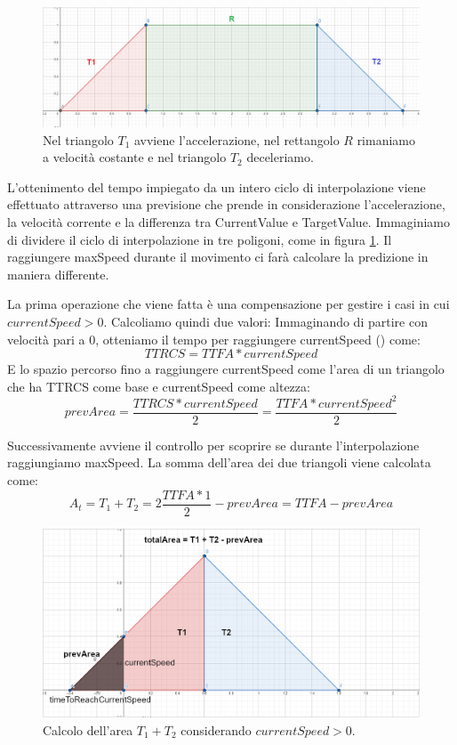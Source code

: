 \documentclass[main.tex]{subfiles}
\begin{document}
\begin{figure}
    \centering
    \captionsetup{justification=centering}
    \includegraphics[scale=0.25]{img/interpolazione/movementThreeParts.png}
    \caption{Nel triangolo $T_1$ avviene l'accelerazione, nel rettangolo $R$ rimaniamo a velocità costante e nel triangolo $T_2$ deceleriamo.}
    \label{fig:4_movementThreeParts}
\end{figure}
\noindent L'ottenimento del tempo impiegato da un intero ciclo di interpolazione viene effettuato attraverso una previsione che prende in considerazione l'accelerazione, la velocità corrente e la differenza tra CurrentValue e TargetValue. Immaginiamo di dividere il ciclo di interpolazione in tre poligoni, come in figura \ref{fig:4_movementThreeParts}. Il raggiungere maxSpeed durante il movimento ci farà calcolare la predizione in maniera differente. \newline

La prima operazione che viene fatta è una compensazione per gestire i casi in cui $currentSpeed > 0$. Calcoliamo quindi due valori: Immaginando di partire con velocità pari a 0, otteniamo il tempo per raggiungere currentSpeed () come:
\[TTRCS = TTFA * currentSpeed\]
E lo spazio percorso fino a raggiungere currentSpeed come l'area di un triangolo che ha TTRCS come base e currentSpeed come altezza:
\[prevArea = \frac{TTRCS * currentSpeed}{2} = \frac{TTFA * currentSpeed^2}{2}\]

Successivamente avviene il controllo per scoprire se durante l'interpolazione raggiungiamo maxSpeed. La somma dell'area dei due triangoli viene calcolata come:
\[A_t = T_1 + T_2 = 2\frac{TTFA * 1}{2} - prevArea = TTFA - prevArea\]
\begin{figure}[H]
    \centering
    \includegraphics[width=.9\linewidth]{img/interpolazione/speedCapTriangleAreaSplice.png}
    \caption{Calcolo dell'area $T_1 + T_2$ considerando $currentSpeed > 0$.}
    \label{fig:4_speedCapTriangleAreaSplice}
\end{figure}
\end{document}
